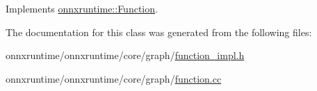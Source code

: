 Implements \mbox{\hyperlink{classonnxruntime_1_1Function_aad1b1f67422088275cb4ce6470aa906a}{onnxruntime\+::\+Function}}.



The documentation for this class was generated from the following files\+:\begin{DoxyCompactItemize}
\item 
onnxruntime/onnxruntime/core/graph/\mbox{\hyperlink{function__impl_8h}{function\+\_\+impl.\+h}}\item 
onnxruntime/onnxruntime/core/graph/\mbox{\hyperlink{function_8cc}{function.\+cc}}\end{DoxyCompactItemize}
